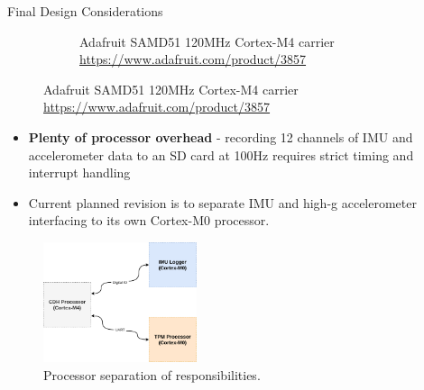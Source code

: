 \documentclass[UKenglish]{beamer}
\begin{document}
\begin{frame}[allowframebreaks]{Final Design Considerations}
\begin{figure}[h!]
\begin{subfigure}{0.4\textwidth}
			\caption{Adafruit SAMD51 120MHz Cortex-M4 carrier \tiny{\url{https://www.adafruit.com/product/3857}}}
		\end{subfigure}
	\end{figure}

	\begin{itemize}
		\item \textbf{Plenty of processor overhead} - recording 12 channels of IMU and accelerometer data to an SD card at 100Hz requires strict timing and interrupt handling
		\item Current planned revision is to separate IMU and high-g accelerometer interfacing to its own Cortex-M0 processor.
	\end{itemize}

	\begin{figure}
		\centering
		\includegraphics[width=0.4\textwidth]{images/amtps-processor-setup.png}
		\caption{Processor separation of responsibilities.}		
	\end{figure}

\end{frame}
\end{document}
